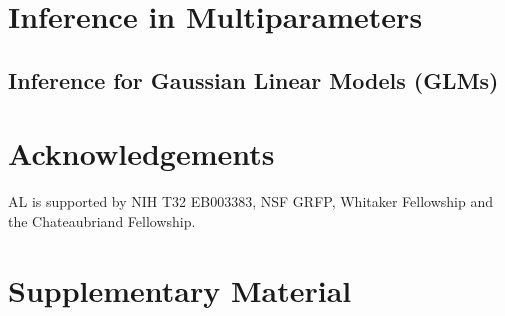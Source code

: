 \documentclass{article}
\theoremstyle{definition}
\theoremstyle{remark}
\newcommand{\beginsupplement}{%
        \setcounter{table}{0}
        \renewcommand{\thetable}{S\arabic{table}}%
        \setcounter{figure}{0}
        \renewcommand{\thefigure}{S\arabic{figure}}%
     }
\begin{document}










\section{Inference in Multiparameters}

	\subsection{Inference for Gaussian Linear Models (GLMs)}


\section{Acknowledgements}
  
  AL is supported by NIH T32 EB003383, NSF GRFP, Whitaker Fellowship and the Chateaubriand Fellowship. 

\newpage
\section{Supplementary Material}
\beginsupplement
  
\clearpage
\newpage
  
\end{document}
